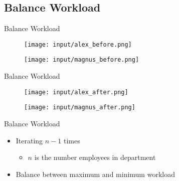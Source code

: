 \subsection*{Balance Workload}
\begin{frame}{Balance Workload}
\begin{figure}[H]
	\centering
		\texttt{[image: input/alex\_before.png]}
	\label{fig:alex_before}
\end{figure}

\begin{figure}[H]
	\centering
		\texttt{[image: input/magnus\_before.png]}
	\label{fig:magnus_before}
\end{figure}
\end{frame}

\begin{frame}{Balance Workload}
\begin{figure}[H]
	\centering
		\texttt{[image: input/alex\_after.png]}
	\label{fig:alex_after}
\end{figure}

\begin{figure}[H]
	\centering
		\texttt{[image: input/magnus\_after.png]}
	\label{fig:magnus_after}
\end{figure}
\end{frame}

\begin{frame}{Balance Workload}

\begin{itemize}
	\item Iterating $n-1$ times
	\begin{itemize}
		\item $n$ is the number employees in department
	\end{itemize}
	\item Balance between maximum and minimum workload
\end{itemize}

\end{frame}

